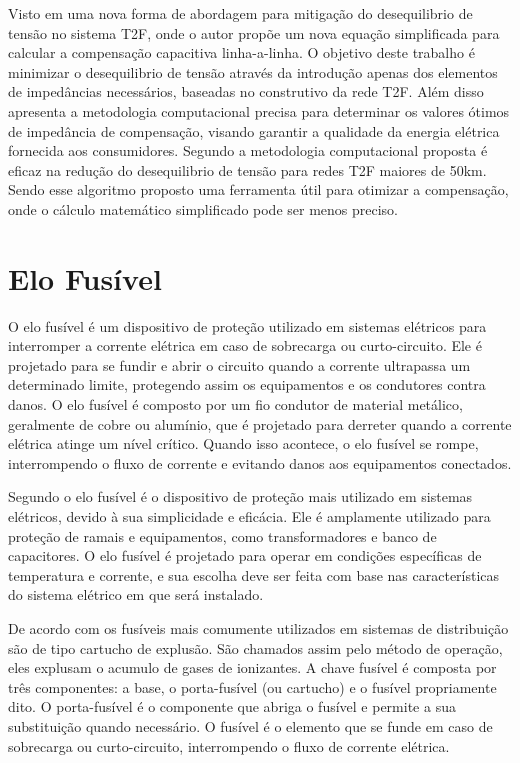 \documentclass[oneside,openright,12pt]{ufsm_2021} %
\begin{document}
\par Visto em \cite{silveira_new_2024} uma nova forma de abordagem para mitigação do desequilibrio de tensão no sistema T2F, onde o autor propõe um nova equação simplificada para calcular a compensação capacitiva linha-a-linha. O objetivo deste trabalho é minimizar o desequilibrio de tensão através da introdução apenas dos elementos de impedâncias necessários, baseadas no construtivo da rede T2F. Além disso apresenta a metodologia computacional precisa para determinar os valores ótimos de impedância de compensação, visando garantir a qualidade da energia elétrica fornecida aos consumidores. Segundo \cite{silveira_new_2024} a metodologia computacional proposta é eficaz na redução do desequilibrio de tensão para redes T2F maiores de 50km. Sendo esse algoritmo proposto uma ferramenta útil para otimizar a compensação, onde o cálculo matemático simplificado pode ser menos preciso.

\section{Elo Fusível}

\par O elo fusível é um dispositivo de proteção utilizado em sistemas elétricos para interromper a corrente elétrica em caso de sobrecarga ou curto-circuito. Ele é projetado para se fundir e abrir o circuito quando a corrente ultrapassa um determinado limite, protegendo assim os equipamentos e os condutores contra danos. O elo fusível é composto por um fio condutor de material metálico, geralmente de cobre ou alumínio, que é projetado para derreter quando a corrente elétrica atinge um nível crítico. Quando isso acontece, o elo fusível se rompe, interrompendo o fluxo de corrente e evitando danos aos equipamentos conectados.

\par Segundo \cite{gonen_electric_1988} o elo fusível é o dispositivo de proteção mais utilizado em sistemas elétricos, devido à sua simplicidade e eficácia. Ele é amplamente utilizado para proteção de ramais e equipamentos, como transformadores e banco de capacitores. O elo fusível é projetado para operar em condições específicas de temperatura e corrente, e sua escolha deve ser feita com base nas características do sistema elétrico em que será instalado.

\par De acordo com \cite{gers_protection_2011} os fusíveis mais comumente utilizados em sistemas de distribuição são de tipo cartucho de explusão. São chamados assim pelo método de operação, eles explusam o acumulo de gases de ionizantes. A chave fusível é composta por três componentes: a base, o porta-fusível (ou cartucho) e o fusível propriamente dito. O porta-fusível é o componente que abriga o fusível e permite a sua substituição quando necessário. O fusível é o elemento que se funde em caso de sobrecarga ou curto-circuito, interrompendo o fluxo de corrente elétrica.
\end{document}
